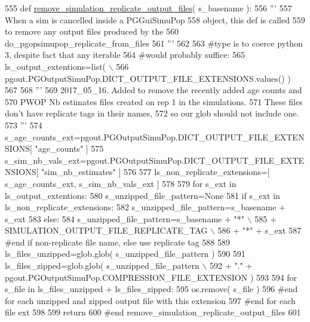 \begin{DoxyCode}
555 \textcolor{keyword}{def }\hyperlink{namespacenegui_1_1pgutilities_aa37c7d125e4eaec2eeea639f53fa140d}{remove\_simulation\_replicate\_output\_files}( s\_basename ):
556     \textcolor{stringliteral}{'''}
557 \textcolor{stringliteral}{    When a sim is cancelled inside a PGGuiSimuPop}
558 \textcolor{stringliteral}{    object, this def is called}
559 \textcolor{stringliteral}{    to remove any output files produced by the}
560 \textcolor{stringliteral}{    do\_pgopsimupop\_replicate\_from\_files}
561 \textcolor{stringliteral}{    '''}
562 
563     \textcolor{comment}{#type is to coerce python 3, despite fact that any iterable}
564     \textcolor{comment}{#would probably suffice:}
565     ls\_output\_extentions=list( \(\backslash\)
566             pgout.PGOutputSimuPop.DICT\_OUTPUT\_FILE\_EXTENSIONS.values() )
567 
568     \textcolor{stringliteral}{'''}
569 \textcolor{stringliteral}{    2017\_05\_16. Added to remove the recently added age counts and }
570 \textcolor{stringliteral}{    PWOP Nb estimates files created on rep 1 in the simulations.}
571 \textcolor{stringliteral}{    These files don't have replicate tags in their names, }
572 \textcolor{stringliteral}{    so our glob should not include one.}
573 \textcolor{stringliteral}{    '''}
574     s\_age\_counts\_ext=pgout.PGOutputSimuPop.DICT\_OUTPUT\_FILE\_EXTENSIONS[ \textcolor{stringliteral}{"age\_counts"} ]
575     s\_sim\_nb\_vals\_ext=pgout.PGOutputSimuPop.DICT\_OUTPUT\_FILE\_EXTENSIONS[ \textcolor{stringliteral}{"sim\_nb\_estimates"} ]
576 
577     ls\_non\_replicate\_extensions=[ s\_age\_counts\_ext, s\_sim\_nb\_vals\_ext ]
578 
579     \textcolor{keywordflow}{for} s\_ext \textcolor{keywordflow}{in} ls\_output\_extentions:
580         s\_unzipped\_file\_pattern=\textcolor{keywordtype}{None}    
581         \textcolor{keywordflow}{if} s\_ext \textcolor{keywordflow}{in} ls\_non\_replicate\_extensions:
582             s\_unzipped\_file\_pattern=s\_basename + s\_ext
583         \textcolor{keywordflow}{else}:
584             s\_unzipped\_file\_pattern=s\_basename + \textcolor{stringliteral}{"*"} \(\backslash\)
585                     + SIMULATION\_OUTPUT\_FILE\_REPLICATE\_TAG \(\backslash\)
586                     + \textcolor{stringliteral}{"*"} + s\_ext
587         \textcolor{comment}{#end if  non-replicate file name, else use replicate tag    }
588 
589         ls\_files\_unzipped=glob.glob( s\_unzipped\_file\_pattern )
590 
591         ls\_files\_zipped=glob.glob( s\_unzipped\_file\_pattern \(\backslash\)
592                 + \textcolor{stringliteral}{"."} + pgout.PGOutputSimuPop.COMPRESSION\_FILE\_EXTENSION )
593 
594         \textcolor{keywordflow}{for} s\_file \textcolor{keywordflow}{in} ls\_files\_unzipped + ls\_files\_zipped:
595             os.remove( s\_file )
596         \textcolor{comment}{#end for each unzipped and zipped output file with this extension}
597     \textcolor{comment}{#end for each file ext}
598 
599     \textcolor{keywordflow}{return}
600 \textcolor{comment}{#end remove\_simulation\_replicate\_output\_files}
601 
\end{DoxyCode}
